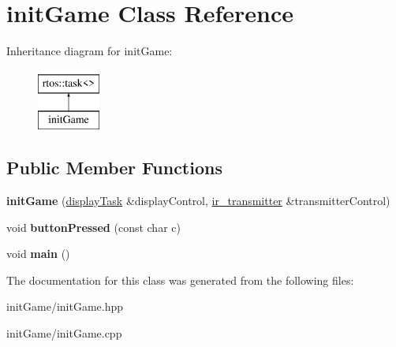 \hypertarget{classinit_game}{}\section{init\+Game Class Reference}
\label{classinit_game}
Inheritance diagram for init\+Game\+:\begin{figure}[H]
\begin{center}
\leavevmode
\includegraphics[height=2.000000cm]{classinit_game}
\end{center}
\end{figure}
\subsection*{Public Member Functions}
\begin{DoxyCompactItemize}
\item 
\mbox{\label{classinit_game_af5c35bf90af47c83323a2202838ba88e}} 
{\bfseries init\+Game} (\mbox{\hyperlink{classdisplay_task}{display\+Task}} \&display\+Control, \mbox{\hyperlink{classir__transmitter}{ir\+\_\+transmitter}} \&transmitter\+Control)
\item 
\mbox{\label{classinit_game_aaf342b77e471eeb385fbc966dc9cf467}} 
void {\bfseries button\+Pressed} (const char c)
\item 
\mbox{\label{classinit_game_a94baf61c3957ffc14961f8bbdcf44a16}} 
void {\bfseries main} ()
\end{DoxyCompactItemize}


The documentation for this class was generated from the following files\+:\begin{DoxyCompactItemize}
\item 
init\+Game/init\+Game.\+hpp\item 
init\+Game/init\+Game.\+cpp\end{DoxyCompactItemize}
